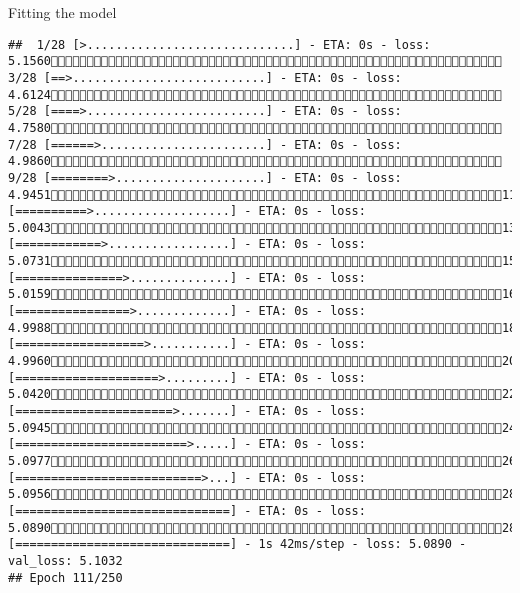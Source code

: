 \documentclass[
  ignorenonframetext,
]{beamer}
\begin{document}
\begin{frame}[fragile]{Fitting the model}
\begin{verbatim}
##  1/28 [>.............................] - ETA: 0s - loss: 5.1560 3/28 [==>...........................] - ETA: 0s - loss: 4.6124 5/28 [====>.........................] - ETA: 0s - loss: 4.7580 7/28 [======>.......................] - ETA: 0s - loss: 4.9860 9/28 [========>.....................] - ETA: 0s - loss: 4.945111/28 [==========>...................] - ETA: 0s - loss: 5.004313/28 [============>.................] - ETA: 0s - loss: 5.073115/28 [===============>..............] - ETA: 0s - loss: 5.015916/28 [================>.............] - ETA: 0s - loss: 4.998818/28 [==================>...........] - ETA: 0s - loss: 4.996020/28 [====================>.........] - ETA: 0s - loss: 5.042022/28 [======================>.......] - ETA: 0s - loss: 5.094524/28 [========================>.....] - ETA: 0s - loss: 5.097726/28 [==========================>...] - ETA: 0s - loss: 5.095628/28 [==============================] - ETA: 0s - loss: 5.089028/28 [==============================] - 1s 42ms/step - loss: 5.0890 - val_loss: 5.1032
## Epoch 111/250

\end{verbatim}
\end{frame}
\end{document}
